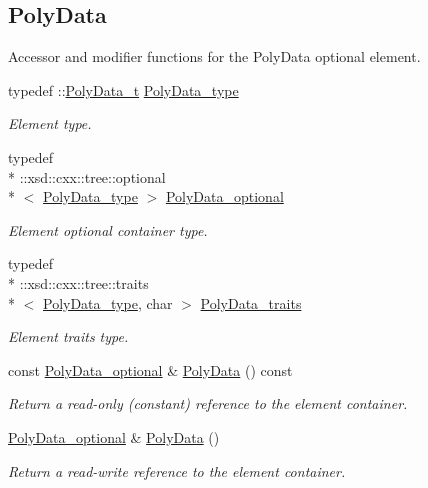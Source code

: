 \subsection*{Poly\-Data}
\label{_amgrpf4abb74983d657d0185d4dd07cff9b2c}%
Accessor and modifier functions for the Poly\-Data optional element. \begin{DoxyCompactItemize}
\item 
typedef \-::\hyperlink{classPolyData__t}{Poly\-Data\-\_\-t} \hyperlink{classVTKFile__t_a4588b4f0e28ba09aa219bda7e1fc6c97}{Poly\-Data\-\_\-type}
\begin{DoxyCompactList}\small\item\em Element type. \end{DoxyCompactList}\item 
typedef \\*
\-::xsd\-::cxx\-::tree\-::optional\\*
$<$ \hyperlink{classVTKFile__t_a4588b4f0e28ba09aa219bda7e1fc6c97}{Poly\-Data\-\_\-type} $>$ \hyperlink{classVTKFile__t_aacb796775ae228cd61726a23b809f3e4}{Poly\-Data\-\_\-optional}
\begin{DoxyCompactList}\small\item\em Element optional container type. \end{DoxyCompactList}\item 
typedef \\*
\-::xsd\-::cxx\-::tree\-::traits\\*
$<$ \hyperlink{classVTKFile__t_a4588b4f0e28ba09aa219bda7e1fc6c97}{Poly\-Data\-\_\-type}, char $>$ \hyperlink{classVTKFile__t_aa5ad98f5709c1e9beec3804a7f42b5f6}{Poly\-Data\-\_\-traits}
\begin{DoxyCompactList}\small\item\em Element traits type. \end{DoxyCompactList}\item 
const \hyperlink{classVTKFile__t_aacb796775ae228cd61726a23b809f3e4}{Poly\-Data\-\_\-optional} \& \hyperlink{classVTKFile__t_a7d728d7f31157fc80117c2f80978344c}{Poly\-Data} () const 
\begin{DoxyCompactList}\small\item\em Return a read-\/only (constant) reference to the element container. \end{DoxyCompactList}\item 
\hyperlink{classVTKFile__t_aacb796775ae228cd61726a23b809f3e4}{Poly\-Data\-\_\-optional} \& \hyperlink{classVTKFile__t_a0f87118c1898bc43619fa0bade52e921}{Poly\-Data} ()
\begin{DoxyCompactList}\small\item\em Return a read-\/write reference to the element container. \end{DoxyCompactList}\item 

\end{DoxyCompactItemize}
